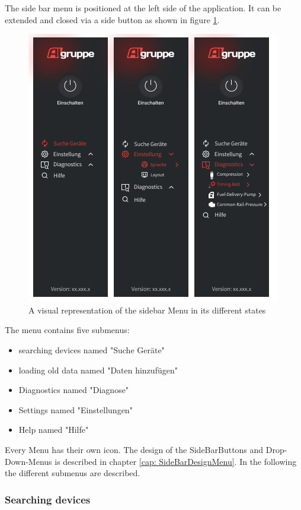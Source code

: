 \documentclass[]{scrreprt}
\begin{document}
The side bar menu is positioned at the left side of the application. It can be extended and closed via a side button as shown in figure \ref{fig: sidebarMenu}. 
\begin{figure}
    \includegraphics[width=.9\textwidth]{assets/pictures/SideBarMenu.png}
    \caption[]{A visual representation of the sidebar Menu in its different states}
    \label{fig: sidebarMenu}
\end{figure}
The menu contains five submenus:
\begin{itemize}
        \item searching devices named "Suche Geräte"
        \item loading old data named "Daten hinzufügen"
        \item Diagnostics named "Diagnose"
        \item Settings named "Einstellungen"
        \item Help named "Hilfe"
\end{itemize}
Every Menu has their own icon. The design of the SideBarButtons and Drop-Down-Menus is described in chapter \ref{cap: SideBarDesignMenu}. 
In the following the different submenus are described.

\subsubsection{Searching devices}
\end{document}
